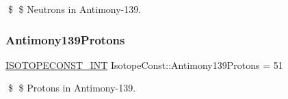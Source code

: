 \$ \$ Neutrons in Antimony-\/139. \mbox{\label{group___isotope_const-_antimony-_sb139_ga1f7d88f4d6407ed5f3d3c3c70a59c4cc}} 
\subsubsection{\texorpdfstring{Antimony139\+Protons}{Antimony139Protons}}
{\footnotesize\ttfamily \mbox{\hyperlink{group___isotope_const-_macros_ga5f18360b3e99483a35c32d789e62621c}{I\+S\+O\+T\+O\+P\+E\+C\+O\+N\+S\+T\+\_\+\+I\+NT}} Isotope\+Const\+::\+Antimony139\+Protons = 51}

\$ \$ Protons in Antimony-\/139. 